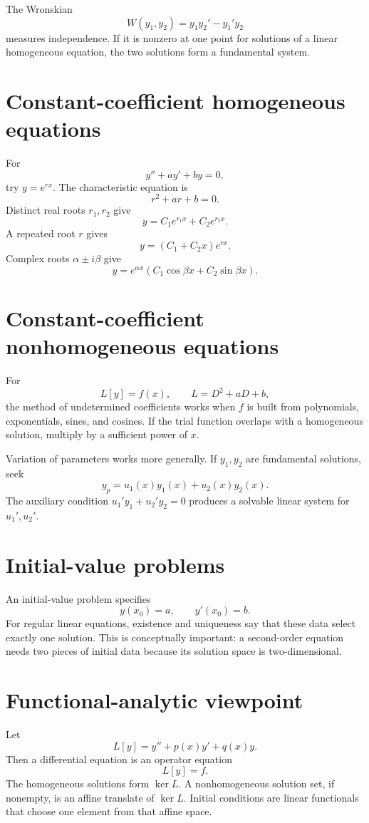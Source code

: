 The Wronskian
\[
  W(y_1,y_2)=y_1y_2'-y_1'y_2
\]
measures independence.  If it is nonzero at one point for solutions of a linear homogeneous equation, the two solutions form a fundamental system.

\section{Constant-coefficient homogeneous equations}

For
\[
  y''+ay'+by=0,
\]
try $y=e^{rx}$.  The characteristic equation is
\[
  r^2+ar+b=0.
\]
Distinct real roots $r_1,r_2$ give
\[
  y=C_1e^{r_1x}+C_2e^{r_2x}.
\]
A repeated root $r$ gives
\[
  y=(C_1+C_2x)e^{rx}.
\]
Complex roots $\alpha\pm i\beta$ give
\[
  y=e^{\alpha x}(C_1\cos\beta x+C_2\sin\beta x).
\]

\section{Constant-coefficient nonhomogeneous equations}

For
\[
  L[y]=f(x),\qquad L=D^2+aD+b,
\]
the method of undetermined coefficients works when $f$ is built from polynomials, exponentials, sines, and cosines.  If the trial function overlaps with a homogeneous solution, multiply by a sufficient power of $x$.

Variation of parameters works more generally.  If $y_1,y_2$ are fundamental solutions, seek
\[
  y_p=u_1(x)y_1(x)+u_2(x)y_2(x).
\]
The auxiliary condition $u_1'y_1+u_2'y_2=0$ produces a solvable linear system for $u_1',u_2'$.

\section{Initial-value problems}

An initial-value problem specifies
\[
  y(x_0)=a,\qquad y'(x_0)=b.
\]
For regular linear equations, existence and uniqueness say that these data select exactly one solution.  This is conceptually important: a second-order equation needs two pieces of initial data because its solution space is two-dimensional.

\section{Functional-analytic viewpoint}

Let
\[
  L[y]=y''+p(x)y'+q(x)y.
\]
Then a differential equation is an operator equation
\[
  L[y]=f.
\]
The homogeneous solutions form $\ker L$.  A nonhomogeneous solution set, if nonempty, is an affine translate of $\ker L$.  Initial conditions are linear functionals that choose one element from that affine space.

